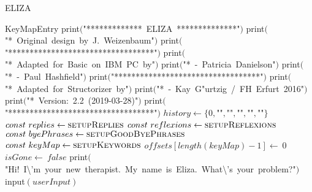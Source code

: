 \documentclass[a4paper,10pt]{article}
\begin{document}
\begin{algorithm}
\caption{ELIZA}
\begin{algorithmic}[5]
\State {}
\State {}
\State {}
\State {}
\State {}
\State {}
\State {}
\State {}
\State {}
\State {}
    \State KeyMapEntry
  \EndDecl
  \State \(\)print\((\)"{}*************\ ELIZA\ **************"{}\()\)
  \State \(\)print\((\)"{}*\ Original\ design\ by\ J.\ Weizenbaum"{}\()\)
  \State \(\)print\((\)"{}**********************************"{}\()\)
  \State \(\)print\((\)"{}*\ Adapted\ for\ Basic\ on\ IBM\ PC\ by"{}\()\)
  \State \(\)print\((\)"{}*\ -\ Patricia\ Danielson"{}\()\)
  \State \(\)print\((\)"{}*\ -\ Paul\ Hashfield"{}\()\)
  \State \(\)print\((\)"{}**********************************"{}\()\)
  \State \(\)print\((\)"{}*\ Adapted\ for\ Structorizer\ by"{}\()\)
  \State \(\)print\((\)"{}*\ -\ Kay\ G"urtzig\ /\ FH\ Erfurt\ 2016"{}\()\)
  \State \(\)print\((\)"{}*\ Version:\ 2.2\ (2019-03-28)"{}\()\)
  \State \(\)print\((\)"{}**********************************"{}\()\)
  \State {}
  \State {}
  \State \(history\gets\{0,\)"{}"{}\(,\)"{}"{}\(,\)"{}"{}\(,\)"{}"{}\(,\)"{}"{}\(\}\)
  \State \(const\ replies\gets\Call{setupReplies}{}\)
  \State \(const\ reflexions\gets\Call{setupReflexions}{}\)
  \State \(const\ byePhrases\gets\Call{setupGoodByePhrases}{}\)
  \State \(const\ keyMap\gets\Call{setupKeywords}{}\)
  \State \(offsets[length(keyMap)-1]\gets\ 0\)
  \State \(isGone\gets\ false\)
  \State \(\)print\((\)"{}Hi!\ I\textbackslash{}'{}m\ your\ new\ therapist.\ My\ name\ is\ Eliza.\ What\textbackslash{}'{}s\ your\ problem?"{}\()\)
  \Repeat
    \State \(\)input\((userInput)\)
    \State {}

\end{algorithmic}
\end{algorithm}
\end{document}
